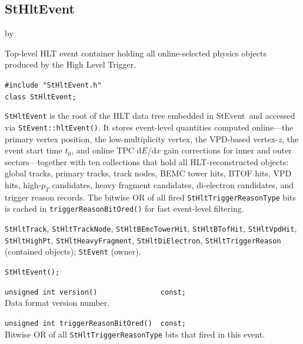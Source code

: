 \documentclass[twoside]{article}
\newcommand{\StEvent}{\textsf{StEvent}}
\newcommand{\entrylabel}[1]{\mbox{\textbf{{#1}}}\hfil}%
\newenvironment{entry}
{\begin{list}{}%
    {\renewcommand{\makelabel}{\entrylabel}%
     \setlength{\labelwidth}{90pt}%
     \setlength{\leftmargin}{\labelwidth}
     \advance\leftmargin by \labelsep%
      }%
    }%
  {\end{list}}
\newcommand{\Entrylabel}[1]%
{\raisebox{0pt}[1ex][0pt]{\makebox[\labelwidth][l]%
    {\parbox[t]{\labelwidth}{\hspace{0pt}\textbf{{#1}}}}}}
\newenvironment{Entry}%
{\renewcommand{\entrylabel}{\Entrylabel}\begin{entry}}%
  {\end{entry}}
\begin{document}
\subsection{StHltEvent}
\label{sec:StHltEvent}
\begin{Entry}
\item[Summary] Top-level HLT event container holding all online-selected
    physics objects produced by the High Level Trigger.
\item[Synopsis]
    \verb+#include "StHltEvent.h"+\\
    \verb+class StHltEvent;+\\
\item[Description]
    \texttt{StHltEvent} is the root of the HLT data tree embedded in
    \StEvent\ and accessed via \texttt{StEvent::hltEvent()}.  It
    stores event-level quantities computed online---the primary vertex
    position, the low-multiplicity vertex, the VPD-based vertex-$z$,
    the event start time $t_0$, and online TPC d$E$/d$x$ gain
    corrections for inner and outer sectors---together with ten
    collections that hold all HLT-reconstructed objects: global tracks,
    primary tracks, track nodes, BEMC tower hits, BTOF hits, VPD hits,
    high-$p_T$ candidates, heavy fragment candidates, di-electron
    candidates, and trigger reason records.  The bitwise OR of all
    fired \texttt{StHltTriggerReasonType} bits is cached in
    \texttt{triggerReasonBitOred()} for fast event-level filtering.
\item[Related Classes]
    \texttt{StHltTrack}, \texttt{StHltTrackNode},
    \texttt{StHltBEmcTowerHit}, \texttt{StHltBTofHit},
    \texttt{StHltVpdHit}, \texttt{StHltHighPt},
    \texttt{StHltHeavyFragment}, \texttt{StHltDiElectron},
    \texttt{StHltTriggerReason} (contained objects);
    \texttt{StEvent} (owner).
\item[Public\\ Constructors]
    \verb+StHltEvent();+\\
\item[Public Member\\ Functions]
    \verb+unsigned int version()               const;+\\
    Data format version number.

    \verb+unsigned int triggerReasonBitOred()  const;+\\
    Bitwise OR of all \texttt{StHltTriggerReasonType} bits that fired
    in this event.


\end{Entry}
\end{document}
